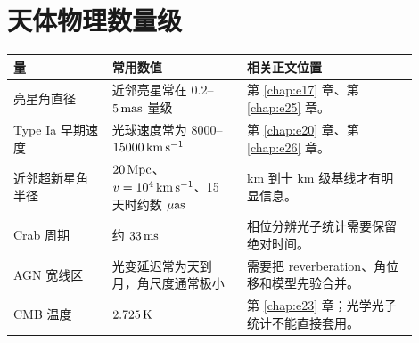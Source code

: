 \section{天体物理数量级}
\label{appsec:b-astro}

\begin{longtable}{p{0.22\linewidth}p{0.30\linewidth}p{0.38\linewidth}}
\toprule
量 & 常用数值 & 相关正文位置 \\
\midrule
亮星角直径 & 近邻亮星常在 \(0.2\)--\(5\,{\rm mas}\) 量级 & 第 \ref{chap:e17} 章、第 \ref{chap:e25} 章。 \\
Type Ia 早期速度 & 光球速度常为 \(8000\)--\(15000\,{\rm km\,s^{-1}}\) & 第 \ref{chap:e20} 章、第 \ref{chap:e26} 章。 \\
近邻超新星角半径 & \(20\,{\rm Mpc}\)、\(v=10^4\,{\rm km\,s^{-1}}\)、15 天时约数 \(\mu{\rm as}\) & km 到十 km 级基线才有明显信息。 \\
Crab 周期 & 约 \(33\,{\rm ms}\) & 相位分辨光子统计需要保留绝对时间。 \\
AGN 宽线区 & 光变延迟常为天到月，角尺度通常极小 & 需要把 reverberation、角位移和模型先验合并。 \\
CMB 温度 & \(2.725\,{\rm K}\) & 第 \ref{chap:e23} 章；光学光子统计不能直接套用。 \\
\bottomrule
\end{longtable}
